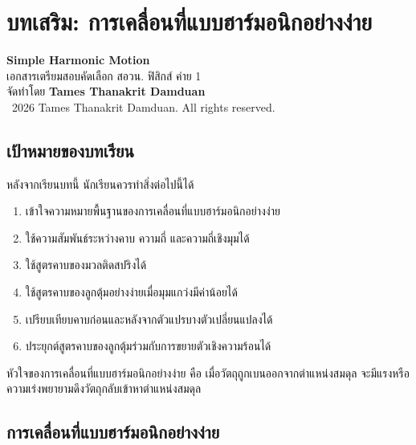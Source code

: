 

\chapter{บทเสริม: การเคลื่อนที่แบบฮาร์มอนิกอย่างง่าย}

\begin{center}
    {\Large \textbf{Simple Harmonic Motion}}\\[4pt]
    {\normalsize เอกสารเตรียมสอบคัดเลือก สอวน. ฟิสิกส์ ค่าย 1}\\[6pt]
    {\normalsize จัดทำโดย \textbf{Tames Thanakrit Damduan}}\\[2pt]
    {\footnotesize \textcopyright\ 2026 Tames Thanakrit Damduan. All rights reserved.}\\[8pt]
\end{center}


\section*{เป้าหมายของบทเรียน}

หลังจากเรียนบทนี้ นักเรียนควรทำสิ่งต่อไปนี้ได้

\begin{enumerate}
    \item เข้าใจความหมายพื้นฐานของการเคลื่อนที่แบบฮาร์มอนิกอย่างง่าย
    \item ใช้ความสัมพันธ์ระหว่างคาบ ความถี่ และความถี่เชิงมุมได้
    \item ใช้สูตรคาบของมวลติดสปริงได้
    \item ใช้สูตรคาบของลูกตุ้มอย่างง่ายเมื่อมุมแกว่งมีค่าน้อยได้
    \item เปรียบเทียบคาบก่อนและหลังจากตัวแปรบางตัวเปลี่ยนแปลงได้
    \item ประยุกต์สูตรคาบของลูกตุ้มร่วมกับการขยายตัวเชิงความร้อนได้
\end{enumerate}

\begin{tcolorbox}[title=แนวคิดสำคัญของบทนี้]
หัวใจของการเคลื่อนที่แบบฮาร์มอนิกอย่างง่าย คือ เมื่อวัตถุถูกเบนออกจากตำแหน่งสมดุล จะมีแรงหรือความเร่งพยายามดึงวัตถุกลับเข้าหาตำแหน่งสมดุล
\end{tcolorbox}

\section{การเคลื่อนที่แบบฮาร์มอนิกอย่างง่าย}

